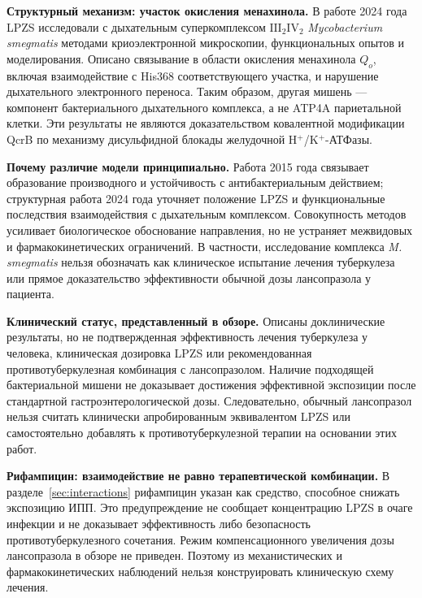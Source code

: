 \documentclass[11pt,a4paper,notitlepage]{report}
\newcommand{\src}[1]{\unskip\space\cite{#1}}
\begin{document}
\textbf{Структурный механизм: участок окисления менахинола.} В работе 2024 года LPZS исследовали с дыхательным суперкомплексом $\mathrm{III}_2\mathrm{IV}_2$ \textit{Mycobacterium smegmatis} методами криоэлектронной микроскопии, функциональных опытов и моделирования. Описано связывание в области окисления менахинола $Q_o$, включая взаимодействие с His368 соответствующего участка, и нарушение дыхательного электронного переноса. Таким образом, другая мишень --- компонент бактериального дыхательного комплекса, а не ATP4A париетальной клетки. Эти результаты не являются доказательством ковалентной модификации QcrB по механизму дисульфидной блокады желудочной H$^+$/K$^+$-АТФазы.\src{moltbstructure}

\textbf{Почему различие модели принципиально.} Работа 2015 года связывает образование производного и устойчивость с антибактериальным действием; структурная работа 2024 года уточняет положение LPZS и функциональные последствия взаимодействия с дыхательным комплексом. Совокупность методов усиливает биологическое обоснование направления, но не устраняет межвидовых и фармакокинетических ограничений. В частности, исследование комплекса \textit{M. smegmatis} нельзя обозначать как клиническое испытание лечения туберкулеза или прямое доказательство эффективности обычной дозы лансопразола у пациента.\src{moltb,moltbstructure}

\textbf{Клинический статус, представленный в обзоре.} Описаны доклинические результаты, но не подтвержденная эффективность лечения туберкулеза у человека, клиническая дозировка LPZS или рекомендованная противотуберкулезная комбинация с лансопразолом. Наличие подходящей бактериальной мишени не доказывает достижения эффективной экспозиции после стандартной гастроэнтерологической дозы. Следовательно, обычный лансопразол нельзя считать клинически апробированным эквивалентом LPZS или самостоятельно добавлять к противотуберкулезной терапии на основании этих работ.\src{moltb,moltbstructure}

\textbf{Рифампицин: взаимодействие не равно терапевтической комбинации.} В разделе~\ref{sec:interactions} рифампицин указан как средство, способное снижать экспозицию ИПП. Это предупреждение не сообщает концентрацию LPZS в очаге инфекции и не доказывает эффективность либо безопасность противотуберкулезного сочетания. Режим компенсационного увеличения дозы лансопразола в обзоре не приведен. Поэтому из механистических и фармакокинетических наблюдений нельзя конструировать клиническую схему лечения.\src{uslabel,moltb,moltbstructure}
\end{document}
